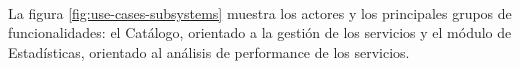 \paragraph{}
La figura \ref{fig:use-cases-subsystems} muestra los actores y los principales
grupos de funcionalidades: el Cat\'alogo, orientado a la gesti\'on de los servicios
y el m\'odulo de Estad\'isticas, orientado al an\'alisis de performance de los servicios.
